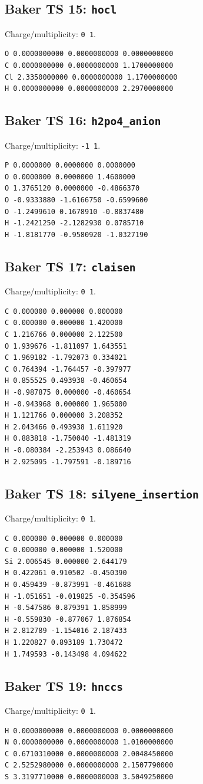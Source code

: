 \documentclass[10pt]{article}
\begin{document}
{\subsection*{Baker TS 15: \texttt{hocl}}
Charge/multiplicity: \texttt{0 1}.
\begin{verbatim}
O 0.0000000000 0.0000000000 0.0000000000
C 0.0000000000 0.0000000000 1.1700000000
Cl 2.3350000000 0.0000000000 1.1700000000
H 0.0000000000 0.0000000000 2.2970000000
\end{verbatim}
\subsection*{Baker TS 16: \texttt{h2po4\_anion}}
Charge/multiplicity: \texttt{-1 1}.
\begin{verbatim}
P 0.0000000 0.0000000 0.0000000
O 0.0000000 0.0000000 1.4600000
O 1.3765120 0.0000000 -0.4866370
O -0.9333880 -1.6166750 -0.6599600
O -1.2499610 0.1678910 -0.8837480
H -1.2421250 -2.1282930 0.0785710
H -1.8181770 -0.9580920 -1.0327190
\end{verbatim}
\subsection*{Baker TS 17: \texttt{claisen}}
Charge/multiplicity: \texttt{0 1}.
\begin{verbatim}
C 0.000000 0.000000 0.000000
C 0.000000 0.000000 1.420000
C 1.216766 0.000000 2.122500
O 1.939676 -1.811097 1.643551
C 1.969182 -1.792073 0.334021
C 0.764394 -1.764457 -0.397977
H 0.855525 0.493938 -0.460654
H -0.987875 0.000000 -0.460654
H -0.943968 0.000000 1.965000
H 1.121766 0.000000 3.208352
H 2.043466 0.493938 1.611920
H 0.883818 -1.750040 -1.481319
H -0.080384 -2.253943 0.086640
H 2.925095 -1.797591 -0.189716
\end{verbatim}
\subsection*{Baker TS 18: \texttt{silyene\_insertion}}
Charge/multiplicity: \texttt{0 1}.
\begin{verbatim}
C 0.000000 0.000000 0.000000
C 0.000000 0.000000 1.520000
Si 2.006545 0.000000 2.644179
H 0.422061 0.910502 -0.450390
H 0.459439 -0.873991 -0.461688
H -1.051651 -0.019825 -0.354596
H -0.547586 0.879391 1.858999
H -0.559830 -0.877067 1.876854
H 2.812789 -1.154016 2.187433
H 1.220827 0.893189 1.730472
H 1.749593 -0.143498 4.094622
\end{verbatim}
\subsection*{Baker TS 19: \texttt{hnccs}}
Charge/multiplicity: \texttt{0 1}.
\begin{verbatim}
H 0.0000000000 0.0000000000 0.0000000000
N 0.0000000000 0.0000000000 1.0100000000
C 0.6710310000 0.0000000000 2.0048450000
C 2.5252980000 0.0000000000 2.1507790000
S 3.3197710000 0.0000000000 3.5049250000
\end{verbatim}
}
\end{document}
